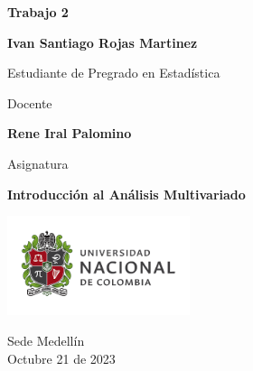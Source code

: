 \begin{titlepage}
   \Large{
   \begin{center}
       \vspace*{1cm}

       \textbf{Trabajo 2}
       
       \vspace{1.5cm}
        
        
       
       \textbf{Ivan Santiago Rojas Martinez} \\
        
       \vspace{1cm}
       
       Estudiante de Pregrado en Estadística
       
       \vspace{1cm}
       
       Docente
       
       \vspace{0.5cm}

       \textbf{Rene Iral Palomino}
       
       \vspace{0.4cm}

       \vspace{1.5cm}
       
       Asignatura
       
       \vspace{0.5cm}

       \textbf{Introducción al Análisis Multivariado}

       \vfill

            
       \vspace{0.1cm}
     
       \includegraphics[width=0.4\textwidth]{DocumentFormat/logounal.png}
            
       Sede Medellín\\
       Octubre 21 de 2023
       
   \end{center}
   }
\end{titlepage}
